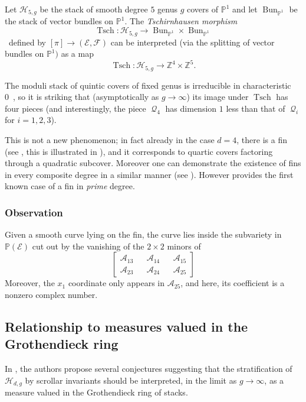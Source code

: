 \documentclass[11pt]{amsart}
\numberwithin{theorem}{section}
\numberwithin{equation}{section}
\theoremstyle{definition}\newtheorem{defn}[theorem]{Definition}
\theoremstyle{definition}\newtheorem{remark}[theorem]{Remark}
\theoremstyle{definition}\newtheorem{question}[theorem]{Question}
\theoremstyle{definition}\newtheorem{problem}[theorem]{Problem}
\newcommand{\ZZ}{\mathbb{Z}}
\newcommand{\PP}{\mathbb{P}}
\newcommand{\cE}{\mathcal{E}}
\newcommand{\cF}{\mathcal{F}}
\newcommand{\cA}{\mathcal{A}}
\newcommand{\cH}{\mathcal{H}}
\DeclareMathOperator{\Tsch}{Tsch}
\DeclareMathOperator{\Bun}{Bun}
\DeclareMathOperator{\qpolytope}{\mathcal{Q}}
\begin{document}
Let $\cH_{5,g}$ be the stack of smooth degree $5$ genus $g$ covers of $\PP^1$ and let $\Bun_{\PP^1}$ be the stack of vector bundles on $\PP^1$. The \emph{Tschirnhausen morphism} 
\[\Tsch \colon \cH_{5,g} \rightarrow \Bun_{\PP^1} \times \Bun_{\PP^1}\]\
defined by $[\pi] \rightarrow (\cE, \cF)$ can be interpreted (via the splitting of vector bundles on $\PP^1)$ as a map 
\[
    \Tsch \colon \cH_{5,g} \rightarrow \ZZ^4 \times \ZZ^5.
\]

The moduli stack of quintic covers of fixed genus is irreducible in characteristic 0~\cite{Fulton-hurwitz}, so it is striking that (asymptotically as $g \rightarrow \infty$) its image under $\Tsch$ has four pieces (and interestingly, the piece $\qpolytope_4$ has dimension $1$ less than that of $\qpolytope_i$ for $i = 1, 2, 3$). 

This is not a new phenomenon; in fact already in the case $d = 4$, there is a fin (see \cite[Section~3]{VV}, this is illustrated in \cite[Figure~1]{VV}), and it corresponds to quartic covers factoring through a quadratic subcover. Moreover one can demonstrate the existence of fins in every composite degree in a similar manner (see \cite[Section~3]{VV}). However  provides the first known case of a fin in \emph{prime} degree. 

\subsubsection{Observation}
Given a smooth curve lying on the fin, the curve lies inside the subvariety in $\PP(\cE)$ cut out by the vanishing of the $2 \times 2$ minors of 
\[
    \begin{bmatrix}
        \cA_{13} && \cA_{14} && \cA_{15} \\
        \cA_{23} && \cA_{24} && \cA_{25}
    \end{bmatrix}
\]
Moreover, the $x_1$ coordinate only appears in $\cA_{25}$, and here, its coefficient is a nonzero complex number.

\subsection{Relationship to measures valued in the Grothendieck ring}

In \cite[Section~8]{VV}, the authors propose several conjectures suggesting that the stratification of $\cH_{d,g}$ by scrollar invariants should be interpreted, in the limit as $g \rightarrow \infty$, as a measure valued in the Grothendieck ring of stacks.
\end{document}
